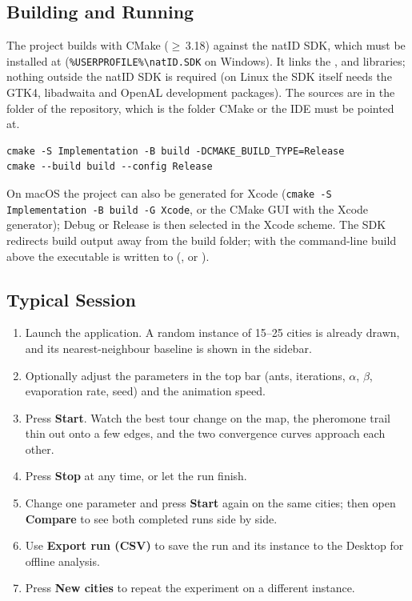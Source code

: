 \documentclass[11pt,a4paper]{article}
\begin{document}
\subsection{Building and Running}
The project builds with CMake ($\ge$\,3.18) against the natID SDK, which must be installed at
 (\texttt{\%USERPROFILE\%\textbackslash natID.SDK} on Windows). It links the ,
 and  libraries; nothing outside the natID SDK is required (on Linux the SDK itself needs the GTK4, libadwaita and OpenAL development packages). The sources are in
the  folder of the repository, which is the folder CMake or the IDE must be pointed at.
\begin{verbatim}
cmake -S Implementation -B build -DCMAKE_BUILD_TYPE=Release
cmake --build build --config Release
\end{verbatim}
On macOS the project can also be generated for Xcode (\texttt{cmake -S Implementation -B build -G Xcode},
or the CMake GUI with the Xcode generator); Debug or Release is then selected in the Xcode scheme. The SDK
redirects build output away from the build folder; with the command-line build above the executable is
written to  (,  or
).

\subsection{Typical Session}
\begin{enumerate}
  \item Launch the application. A random instance of 15--25 cities is already drawn, and its
        nearest-neighbour baseline is shown in the sidebar.
  \item Optionally adjust the parameters in the top bar (ants, iterations, $\alpha$, $\beta$, evaporation
        rate, seed) and the animation speed.
  \item Press \textbf{Start}. Watch the best tour change on the map, the pheromone trail thin out onto a few
        edges, and the two convergence curves approach each other.
  \item Press \textbf{Stop} at any time, or let the run finish.
  \item Change one parameter and press \textbf{Start} again on the same cities; then open
        \textbf{Compare} to see both completed runs side by side.
  \item Use \textbf{Export run (CSV)} to save the run and its instance to the Desktop for offline analysis.
  \item Press \textbf{New cities} to repeat the experiment on a different instance.
\end{enumerate}
\end{document}
